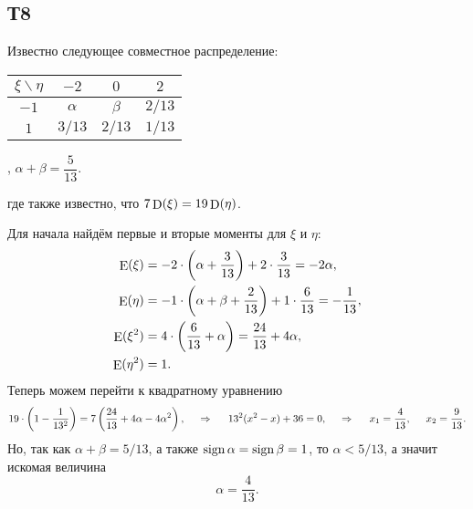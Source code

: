 \subsection*{Т8}


Известно следующее совместное распределение:
\begin{table}[h]
\centering
    \begin{tabular}{c|ccc}
    \toprule
        $\xi\backslash\eta$ & $-2$ & $0$ & $2$  \\
    \midrule
        $-1$ & $\alpha$ & $\beta$ & $2/13$\\
        $1$ & $3/13$ & $2/13$ & $1/13$\\
    \bottomrule
    \end{tabular}
    ,
    \hspace{10 mm}
    $\alpha + \beta = \dfrac{5}{13}$.
\end{table}

\noindent
где также известно, что $7 \mathop{\mathrm{D}}\nolimits (\xi) = 19 \mathop{\mathrm{D}}\nolimits(\eta)$.

Для начала найдём первые и вторые моменты для $\xi$ и $\eta$:
\begin{align*}
    \mathop{\mathrm{E}}\nolimits(\xi) &= - 2 \cdot \left(\alpha + \frac{3}{13}\right) + 2 \cdot \frac{3}{13} = - 2 \alpha, \\
    \mathop{\mathrm{E}}\nolimits(\eta) &= -1 \cdot \left(\alpha + \beta + \frac{2}{13}\right) + 1 \cdot \frac{6}{13} = -\frac{1}{13}, \\
    \mathop{\mathrm{E}}\nolimits(\xi^2) &= 4 \cdot \left(
        \frac{6}{13} + \alpha
    \right) = \frac{24}{13} + 4 \alpha, \\
    \mathop{\mathrm{E}}\nolimits(\eta^2) &= 1.
\end{align*}
Теперь можем перейти к квадратному уравнению
\begin{equation*}
    19 \cdot \left(1 - \frac{1}{13^2}\right) = 7 \left(
        \frac{24}{13} + 4 \alpha - 4 \alpha^2
    \right),
    \hspace{0.5cm} \Rightarrow \hspace{0.5cm}
    13^2 (x^2-x) + 36 = 0,
    \hspace{0.5cm} \Rightarrow \hspace{0.5cm}
    x_1 = \frac{4}{13},
    \hspace{5 mm}
    x_2 = \frac{9}{13}.
\end{equation*}
Но, так как $\alpha + \beta = 5/13$, а также $\mathop{\mathrm{sign}}\nolimits \alpha = \mathop{\mathrm{sign}}\nolimits \beta = 1$, то $\alpha < 5/13$, а значит искомая величина
\begin{equation*}
    \alpha = \frac{4}{13}.
\end{equation*}